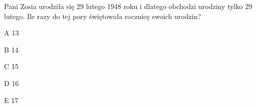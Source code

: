 \begin{tresc}
Pani Zosia urodziła się 29 lutego 1948 roku i dlatego obchodzi urodziny tylko 29 lutego. Ile razy do tej pory świętowała rocznicę swoich urodzin?
\end{tresc}
\begin{wariant}{A} 13 \end{wariant}
\begin{wariant}{B} 14 \end{wariant}
\begin{wariant}{C} 15 \end{wariant}
\begin{wariant}{D} 16 \end{wariant}
\begin{wariant}{E} 17 \end{wariant}
